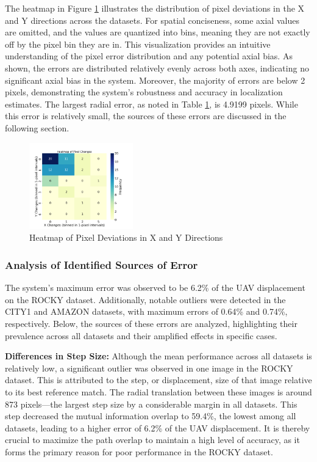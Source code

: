 The heatmap in Figure \ref{fig:Heatmap_XY_Dev} illustrates the distribution of pixel deviations in the X and Y directions across the datasets. For spatial conciseness, some axial values are omitted, and the values are quantized into bins, meaning they are not exactly off by the pixel bin they are in. This visualization provides an intuitive understanding of the pixel error distribution and any potential axial bias. As shown, the errors are distributed relatively evenly across both axes, indicating no significant axial bias in the system. Moreover, the majority of errors are below 2 pixels, demonstrating the system's robustness and accuracy in localization estimates. The largest radial error, as noted in Table \ref{fig:Heatmap_XY_Dev}, is 4.9199 pixels. While this error is relatively small, the sources of these errors are discussed in the following section.




\begin{figure}[H]
    \centering
    \includegraphics[width=0.4\textwidth]{Chapter 5/RESULTPLOTS/XYHEAT.png}
    \caption{Heatmap of Pixel Deviations in X and Y Directions}
    \label{fig:Heatmap_XY_Dev}
\end{figure}



\subsubsection{Analysis of Identified Sources of Error}
\label{sec:Error Analysis}

The system’s maximum error was observed to be 6.2\% of the UAV displacement on the ROCKY dataset. Additionally, notable outliers were detected in the CITY1 and AMAZON datasets, with maximum errors of 0.64\% and 0.74\%, respectively. Below, the sources of these errors are analyzed, highlighting their prevalence across all datasets and their amplified effects in specific cases.

\textbf{Differences in Step Size:}
Although the mean performance across all datasets is relatively low, a significant outlier was observed in one image in the ROCKY dataset. This is attributed to the step, or displacement, size of that image relative to its best reference match. The radial translation between these images is around 873 pixels—the largest step size by a considerable margin in all datasets. This step decreased the mutual information overlap to 59.4\%, the lowest among all datasets, leading to a higher error of 6.2\% of the UAV displacement. It is thereby crucial to maximize the path overlap to maintain a high level of accuracy, as it forms the primary reason for poor performance in the ROCKY dataset.


